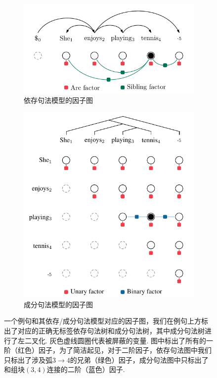 \begin{figure}[tb!]
  \centering
  \begin{subfigure}[b]{0.8\textwidth}
    \centering
    \includegraphics[scale=1]{figures/dep-factors.pdf}
    \caption{依存句法模型的因子图}
    \label{fig:dep-factors}
  \end{subfigure}
  \begin{subfigure}[b]{0.8\textwidth}
    \centering
    \includegraphics[scale=1]{figures/con-factors.pdf}
    \caption{成分句法模型的因子图}
    \label{fig:con-factors}
  \end{subfigure}
  \caption{一个例句和其依存/成分句法模型对应的因子图，我们在例句上方标出了对应的正确无标签依存句法树和成分句法树，其中成分句法树进行了左二叉化.
    灰色虚线圆圈代表被屏蔽的变量.
    图中标出了所有的一阶（红色）因子，为了简洁起见，对于二阶因子，依存句法图中我们只标出了涉及弧$3\rightarrow 4$的兄弟（绿色）因子，成分句法图中只标出了和组块$(3, 4)$连接的二阶（蓝色）因子.}
  \label{fig:vi-factors}
\end{figure}

